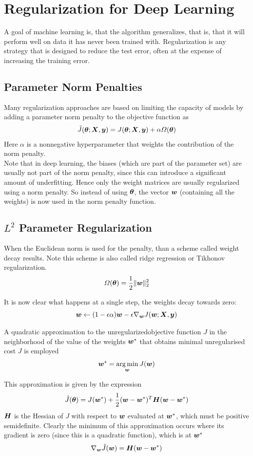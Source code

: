 \section{Regularization for Deep Learning}
\begin{multicols}{2}
	A goal of machine learning is, that the algorithm generalizes, that is, that it will perform well on data it has never been trained with.
	Regularization is any strategy that is designed to reduce the test error, often at the expense of increasing the training error.
	
	\subsection{Parameter Norm Penalties}
	Many regularization approaches are based on limiting the capacity of models by adding a parameter norm penalty to the objective function as
	\[ \tilde{J}(\bolt;\mX,\vy) = J(\bolt;\mX,\vy)+\alpha\Omega(\bolt) \]
	Here $\alpha$ is a nonnegative hyperparameter that weights the contribution of the norm penalty.\\
	
	Note that in deep learning, the biases (which are part of the parameter set) are usually not part of the norm penalty, since this can introduce a significant amount of underfitting. Hence only the weight matrices are usually regularized using a norm penalty. So instead of using $\bolt$, the vector ${\bm{w}}$ (containing all the weights) is now used in the norm penalty function.
	
	\subsection{$L^2$ Parameter Regularization}
	When the Euclidean norm is used for the penalty, than a scheme called weight decay results.
	Note this scheme is also called ridge regression or Tikhonov regularization.
	\[ \Omega(\bolt) = \frac{1}{2} \lVert \vw \rVert_2^2 \]
	
	It is now clear what happens at a single step, the weights decay towards zero:
	\[ {\bm{w}} \leftarrow (1-\epsilon\alpha){\bm{w}}-\epsilon\nabla_{\bm{w}} J({\bm{w}};{\bm{X}},{\bm{y}}) \]
	
	A quadratic approximation to the unregularizedobjective function $J$ in the neighborhood of the value of the weights ${\bm{w}}^\ast$ that obtains minimal unregularised cost $J$ is employed
	\[ {\bm{w}}^\ast = \operatorname*{arg\,min}_{\bm{w}} J({\bm{w}}) \]
	
	This approximation is given by the expression
	\[ \hat{J}(\bolt) = J(\vw^\ast)+\half(\vw-\vw^\ast)^T\mH(\vw-\vw^\ast) \]
	${\bm{H}}$ is the Hessian of $J$ with respect to ${\bm{w}}$ evaluated at ${\bm{w}}^\ast$, which must be positive semidefinite.
	Clearly the minimum of this approximation occurs where its gradient is zero (since this is a quadratic function), which is at ${\bm{w}}^\ast$
	\[ \nabla_{\bm{w}} \hat{J}({\bm{w}})={\bm{H}}({\bm{w}}-{\bm{w}}^\ast) \]
	

\end{multicols}
